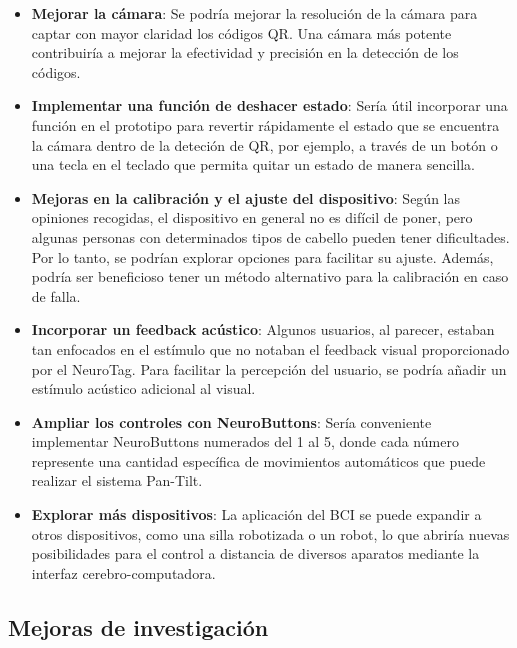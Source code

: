 \begin{itemize}

\item \textbf{Mejorar la cámara}: Se podría mejorar la resolución de la cámara para captar con mayor claridad los códigos QR. Una cámara más potente contribuiría a mejorar la efectividad y precisión en la detección de los códigos.

\item \textbf{Implementar una función de deshacer estado}: Sería útil incorporar una función en el prototipo para revertir rápidamente el estado que se encuentra la cámara dentro de la deteción de QR, por ejemplo, a través de un botón o una tecla en el teclado que permita quitar un estado de manera sencilla.

\item \textbf{Mejoras en la calibración y el ajuste del dispositivo}: Según las opiniones recogidas, el dispositivo en general no es difícil de poner, pero algunas personas con determinados tipos de cabello pueden tener dificultades. Por lo tanto, se podrían explorar opciones para facilitar su ajuste. Además, podría ser beneficioso tener un método alternativo para la calibración en caso de falla.

\item \textbf{Incorporar un feedback acústico}: Algunos usuarios, al parecer, estaban tan enfocados en el estímulo que no notaban el feedback visual proporcionado por el NeuroTag. Para facilitar la percepción del usuario, se podría añadir un estímulo acústico adicional al visual.

\item \textbf{Ampliar los controles con NeuroButtons}: Sería conveniente implementar NeuroButtons numerados del 1 al 5, donde cada número represente una cantidad específica de movimientos automáticos que puede realizar el sistema Pan-Tilt.

\item \textbf{Explorar más dispositivos}: La aplicación del BCI se puede expandir a otros dispositivos, como una silla robotizada o un robot, lo que abriría nuevas posibilidades para el control a distancia de diversos aparatos mediante la interfaz cerebro-computadora.

\end{itemize}



\subsection{Mejoras de investigación}

